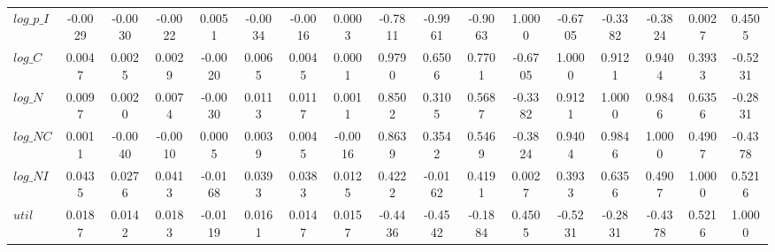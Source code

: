 \begin{center}
\begin{longtable}{lcccccccccccccccc}
$log\_p\_I       $	 & 	           -0.0029	 & 	           -0.0030	 & 	           -0.0022	 & 	            0.0051	 & 	           -0.0034	 & 	           -0.0016	 & 	            0.0003	 & 	           -0.7811	 & 	           -0.9961	 & 	           -0.9063	 & 	            1.0000	 & 	           -0.6705	 & 	           -0.3382	 & 	           -0.3824	 & 	            0.0027	 & 	            0.4505 \\ 
$log\_C          $	 & 	            0.0047	 & 	            0.0025	 & 	            0.0029	 & 	           -0.0020	 & 	            0.0065	 & 	            0.0045	 & 	            0.0001	 & 	            0.9790	 & 	            0.6506	 & 	            0.7701	 & 	           -0.6705	 & 	            1.0000	 & 	            0.9121	 & 	            0.9404	 & 	            0.3933	 & 	           -0.5231 \\ 
$log\_N          $	 & 	            0.0097	 & 	            0.0020	 & 	            0.0074	 & 	           -0.0030	 & 	            0.0113	 & 	            0.0117	 & 	            0.0011	 & 	            0.8502	 & 	            0.3105	 & 	            0.5687	 & 	           -0.3382	 & 	            0.9121	 & 	            1.0000	 & 	            0.9846	 & 	            0.6356	 & 	           -0.2831 \\ 
$log\_NC         $	 & 	            0.0011	 & 	           -0.0040	 & 	           -0.0010	 & 	            0.0005	 & 	            0.0039	 & 	            0.0045	 & 	           -0.0016	 & 	            0.8639	 & 	            0.3542	 & 	            0.5469	 & 	           -0.3824	 & 	            0.9404	 & 	            0.9846	 & 	            1.0000	 & 	            0.4907	 & 	           -0.4378 \\ 
$log\_NI         $	 & 	            0.0435	 & 	            0.0276	 & 	            0.0413	 & 	           -0.0168	 & 	            0.0393	 & 	            0.0383	 & 	            0.0125	 & 	            0.4222	 & 	           -0.0162	 & 	            0.4191	 & 	            0.0027	 & 	            0.3933	 & 	            0.6356	 & 	            0.4907	 & 	            1.0000	 & 	            0.5216 \\ 
${util}          $	 & 	            0.0187	 & 	            0.0142	 & 	            0.0183	 & 	           -0.0119	 & 	            0.0161	 & 	            0.0147	 & 	            0.0157	 & 	           -0.4436	 & 	           -0.4542	 & 	           -0.1884	 & 	            0.4505	 & 	           -0.5231	 & 	           -0.2831	 & 	           -0.4378	 & 	            0.5216	 & 	            1.0000 \\ 
\end{longtable}
 \end{center}
